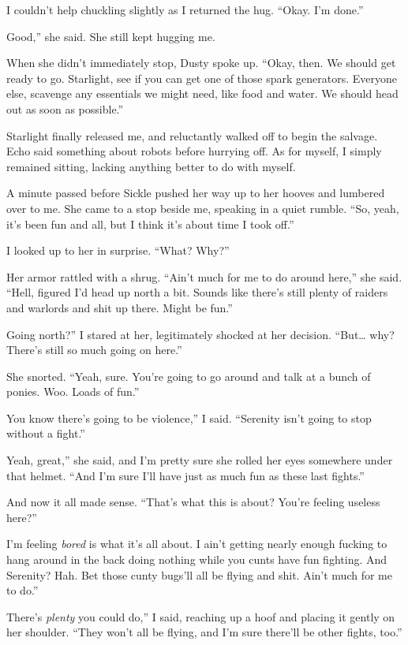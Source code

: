 I couldn’t help chuckling slightly as I returned the hug. “Okay. I’m done.”

\leavevmode{}Good,” she said. She still kept hugging me.

When she didn’t immediately stop, Dusty spoke up. “Okay, then. We should get ready to go. Starlight, see if you can get one of those spark generators. Everyone else, scavenge any essentials we might need, like food and water. We should head out as soon as possible.”

Starlight finally released me, and reluctantly walked off to begin the salvage. Echo said something about robots before hurrying off. As for myself, I simply remained sitting, lacking anything better to do with myself.

A minute passed before Sickle pushed her way up to her hooves and lumbered over to me. She came to a stop beside me, speaking in a quiet rumble. “So, yeah, it’s been fun and all, but I think it’s about time I took off.”

I looked up to her in surprise. “What? Why?”

Her armor rattled with a shrug. “Ain’t much for me to do around here,” she said. “Hell, figured I’d head up north a bit. Sounds like there’s still plenty of raiders and warlords and shit up there. Might be fun.”

\leavevmode{}Going north?” I stared at her, legitimately shocked at her decision. “But… why? There’s still so much going on here.”

She snorted. “Yeah, sure. You’re going to go around and talk at a bunch of ponies. Woo. Loads of fun.”

\leavevmode{}You know there’s going to be violence,” I said. “Serenity isn’t going to stop without a fight.”

\leavevmode{}Yeah, great,” she said, and I’m pretty sure she rolled her eyes somewhere under that helmet. “And I’m sure I’ll have just as much fun as these last fights.”

And now it all made sense. “That’s what this is about? You’re feeling useless here?”

\leavevmode{}I’m feeling \textit{bored} is what it’s all about. I ain’t getting nearly enough fucking to hang around in the back doing nothing while you cunts have fun fighting. And Serenity? Hah. Bet those cunty bugs’ll all be flying and shit. Ain’t much for me to do.”

\leavevmode{}There’s \textit{plenty} you could do,” I said, reaching up a hoof and placing it gently on her shoulder. “They won’t all be flying, and I’m sure there’ll be other fights, too.”

